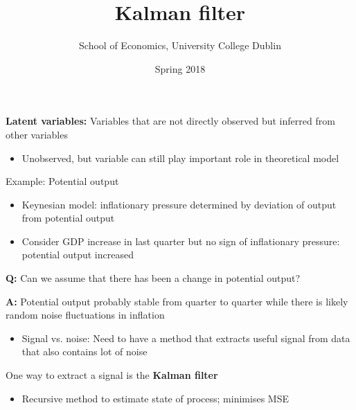 \documentclass{beamer}
\title{Kalman filter}
\author{School of Economics, University College Dublin}
\date{Spring 2018}
\begin{document}
\begin{frame}
 \titlepage
\end{frame}

\begin{frame}
  \textbf{Latent variables:} Variables that are not directly observed but inferred from other variables
  \begin{itemize}
    \item Unobserved, but variable can still play important role in theoretical model
  \end{itemize}
  \medskip
  Example: Potential output
  \begin{itemize}
    \item Keynesian model: inflationary pressure determined by deviation of output from potential output
    \item Consider GDP increase in last quarter but no sign of inflationary pressure: potential output increased
  \end{itemize}  
  \medskip
  \textbf{Q:} Can we assume that there has been a change in potential output?
\end{frame}

\begin{frame}
  \textbf{A:} Potential output probably stable from quarter to quarter while there is likely random noise fluctuations in inflation
  \begin{itemize}
    \item Signal vs. noise: Need to have a method that extracts useful signal from data that also contains lot of noise
  \end{itemize}
  \medskip  
   One way to extract a signal is the \textbf{Kalman filter}
   \begin{itemize}
     \item Recursive method to estimate state of process; minimises MSE
   \end{itemize}
\end{frame}
\end{document}
